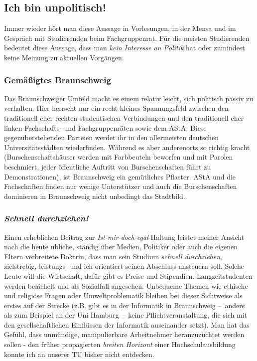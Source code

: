 \begin{multicols}{2}
\subsection{Ich bin unpolitisch!}
	Immer wieder hört man diese Aussage in Vorlesungen, in der Mensa und im Gespräch mit Studierenden beim Fachgruppenrat. Für die meisten Studierenden bedeutet diese Aussage, dass man \emph{kein Interesse an Politik} hat oder zumindest keine Meinung zu aktuellen Vorgängen.

\subsubsection*{Gemäßigtes Braunschweig}

Das Braunschweiger Umfeld macht es einem relativ leicht, sich politisch passiv 
zu verhalten. Hier herrscht nur ein recht kleines Spannungsfeld zwischen den 
traditionell eher rechten studentischen Verbindungen und den traditionell eher 
linken Fachschafts- und Fachgruppenräten sowie dem AStA. Diese 
gegenüberstehenden Parteien werdet ihr in den allermeisten deutschen 
Universitätsstädten wiederfinden. Während es aber anderenorts so richtig 
kracht (Burschenschaftshäuser werden mit Farbbeuteln beworfen und mit Parolen 
beschmiert, jeder öffentliche Auftritt von Burschenschaften führt zu 
Demonstrationen), ist Braunschweig ein gemütliches Pflaster. AStA und die 
Fachschaften finden nur wenige Unterstützer und auch die Burschenschaften 
dominieren in Braunschweig nicht unbedingt das Stadtbild.

\subsubsection*{\emph{Schnell durchziehen!}}

Einen erheblichen Beitrag zur \emph{Ist-mir-doch-egal}-Haltung leistet meiner 
Ansicht nach die heute übliche, ständig über Medien, Politiker oder auch die 
eigenen Eltern verbreitete Doktrin, dass man sein Studium \emph{schnell 
durchziehen}, zielstrebig, leistungs- und ich-orientiert seinen Abschluss 
ansteuern soll. Solche Leute will die Wirtschaft, dafür gibt es Preise und 
Stipendien. Langzeitstudenten werden belächelt und als Sozialfall angesehen. 
Unbequeme Themen wie ethische und religiöse Fragen oder Umweltproblematik 
bleiben bei dieser Sichtweise als erstes auf der Strecke (z.B. gibt es in der 
Informatik in Braunschweig --~anders als zum Beispiel an der Uni Hamburg~-- 
keine Pflichtveranstaltung, die sich mit den gesellschaftlichen Einflüssen der 
Informatik auseinander setzt). Man hat das Gefühl, dass unmündige, 
manipulierbare Arbeitnehmer heranzuzüchtet werden sollen - den früher 
propagierten \emph{breiten Horizont} einer Hochschulausbildung konnte ich an 
unserer TU bisher nicht entdecken.


\end{multicols}
